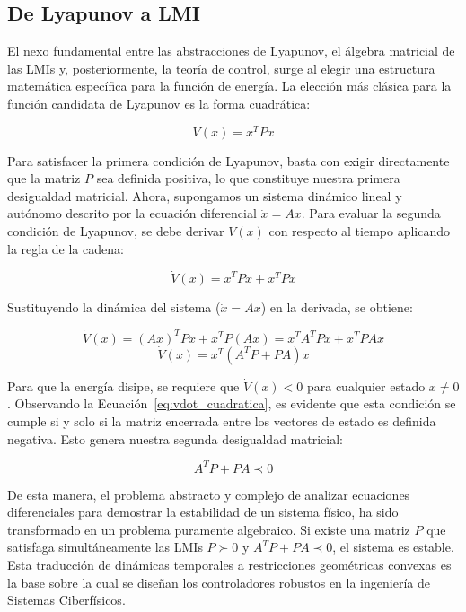 \subsection{De Lyapunov a LMI}

El nexo fundamental entre las abstracciones de Lyapunov, el álgebra matricial de las LMIs y, posteriormente, la teoría de control, surge al elegir una estructura matemática específica para la función de energía. La elección más clásica para la función candidata de Lyapunov es la forma cuadrática:

\begin{equation}
    V(x) = x^T P x
    \label{eq:lyap_cuadratica}
\end{equation}

Para satisfacer la primera condición de Lyapunov, basta con exigir directamente que la matriz $P$ sea definida positiva, lo que constituye nuestra primera desigualdad matricial. Ahora, supongamos un sistema dinámico lineal y autónomo descrito por la ecuación diferencial $\dot{x} = A x$. Para evaluar la segunda condición de Lyapunov, se debe derivar $V(x)$ con respecto al tiempo aplicando la regla de la cadena:

\begin{equation}
    \dot{V}(x) = \dot{x}^T P x + x^T P \dot{x}
    \label{eq:vdot_regla_cadena}
\end{equation}

Sustituyendo la dinámica del sistema ($\dot{x} = A x$) en la derivada, se obtiene:

\begin{equation}
    \dot{V}(x) = (A x)^T P x + x^T P (A x) = x^T A^T P x + x^T P A x
    \label{eq:vdot_sustitucion}
\end{equation}
\begin{equation}
    \dot{V}(x) = x^T \left( A^T P + P A \right) x
    \label{eq:vdot_cuadratica}
\end{equation}

Para que la energía disipe, se requiere que $\dot{V}(x) < 0$ para cualquier estado $x \neq 0$. Observando la Ecuación~\eqref{eq:vdot_cuadratica}, es evidente que esta condición se cumple si y solo si la matriz encerrada entre los vectores de estado es definida negativa. Esto genera nuestra segunda desigualdad matricial:

\begin{equation}
    A^T P + P A \prec 0
    \label{eq:lyap_lti}
\end{equation}

De esta manera, el problema abstracto y complejo de analizar ecuaciones diferenciales para demostrar la estabilidad de un sistema físico, ha sido transformado en un problema puramente algebraico. Si existe una matriz $P$ que satisfaga simultáneamente las LMIs $P \succ 0$ y $A^T P + P A \prec 0$, el sistema es estable. Esta traducción de dinámicas temporales a restricciones geométricas convexas es la base sobre la cual se diseñan los controladores robustos en la ingeniería de Sistemas Ciberfísicos.


